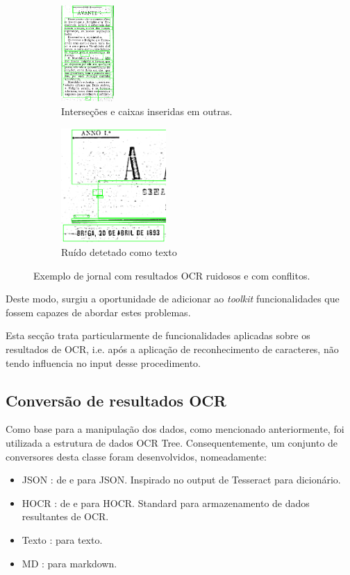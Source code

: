 \begin{figure}[H]
	\begin{subfigure}{.5\textwidth}
		\centering
		\includegraphics[width=2cm]{images/ilustracoes/noisy_ocr_results_intersections.png}
		\caption{Interseções e caixas inseridas em outras.}
		\label{fig:noisy_image_intersections}
	\end{subfigure}%
	\begin{subfigure}{.5\textwidth}
		\centering
		\includegraphics[width=4cm]{images/ilustracoes/noisy_ocr_results_noise.png}
		\caption{Ruído detetado como texto}
		\label{fig:noisy_image_noise}
	\end{subfigure}
	\caption{Exemplo de jornal com resultados OCR ruidosos e com conflitos.}
	\label{fig:fig}
\end{figure}


Deste modo, surgiu a oportunidade de adicionar ao \textit{toolkit} funcionalidades que fossem capazes de abordar estes problemas.

Esta secção trata particularmente de funcionalidades aplicadas sobre os resultados de OCR, i.e. após a aplicação de reconhecimento de caracteres, não tendo influencia no input desse procedimento.


\subsection{Conversão de resultados OCR}
\label{ocr_results_conversion}

Como base para a manipulação dos dados, como mencionado anteriormente, foi utilizada a estrutura de dados OCR Tree. Consequentemente, um conjunto de conversores desta classe foram desenvolvidos, nomeadamente:

\begin{itemize}
	\item JSON : de e para JSON. Inspirado no output de Tesseract para dicionário.
	\item HOCR : de e para HOCR. Standard para armazenamento de dados resultantes de OCR.
	\item Texto : para texto.
	\item MD : para markdown.
\end{itemize}


